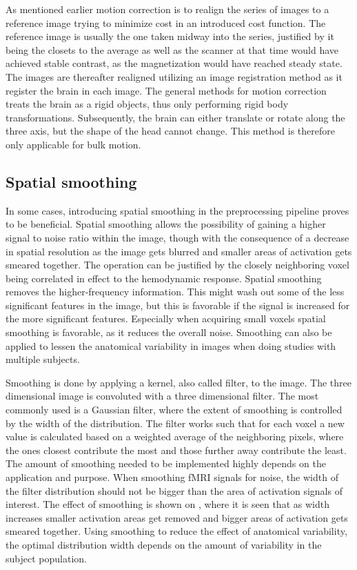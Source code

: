 As mentioned earlier motion correction is to realign the series of images to a reference image trying to minimize cost in an introduced cost function. The reference image is usually the one taken midway into the series, justified by it being the closets to the average as well as the scanner at that time would have achieved stable contrast, as the magnetization would have reached steady state. The images are thereafter realigned utilizing an image registration method as it register the brain in each image. The general methods for motion correction treats the brain as a rigid objects, thus only performing rigid body transformations. Subsequently, the brain can either translate or rotate along the three axis, but the shape of the head cannot change. This method is therefore only applicable for bulk motion. \cite{Poldrack2011} 

\subsection{Spatial smoothing}

In some cases, introducing spatial smoothing in the preprocessing pipeline proves to be beneficial. Spatial smoothing allows the possibility of gaining a higher signal to noise ratio within the image, though with the consequence of a decrease in spatial resolution as the image gets blurred and smaller areas of activation gets smeared together. The operation can be justified by the closely neighboring voxel being correlated in effect to the hemodynamic response. Spatial smoothing removes the higher-frequency information. This might wash out some of the less significant features in the image, but this is favorable if the signal is increased for the more significant features. Especially when acquiring small voxels spatial smoothing is favorable, as it reduces the overall noise. Smoothing can also be applied to lessen the anatomical variability in images when doing studies with multiple subjects. \cite{Poldrack2011}

Smoothing is done by applying a kernel, also called filter, to the image. The three dimensional image is convoluted with a three dimensional filter. The most commonly used is a Gaussian filter, where the extent of smoothing is controlled by the width of the distribution. The filter works such that for each voxel a new value is calculated based on a weighted average of the neighboring pixels, where the ones closest contribute the most and those further away contribute the least. The amount of smoothing needed to be implemented highly depends on the application and purpose. When smoothing fMRI signals for noise, the width of the filter distribution should not be bigger than the area of activation signals of interest. The effect of smoothing is shown on , where it is seen that as width increases smaller activation areas get removed and bigger areas of activation gets smeared together. 
Using smoothing to reduce the effect of anatomical variability, the optimal distribution width depends on the amount of variability in the subject population. \cite{Poldrack2011}
  


